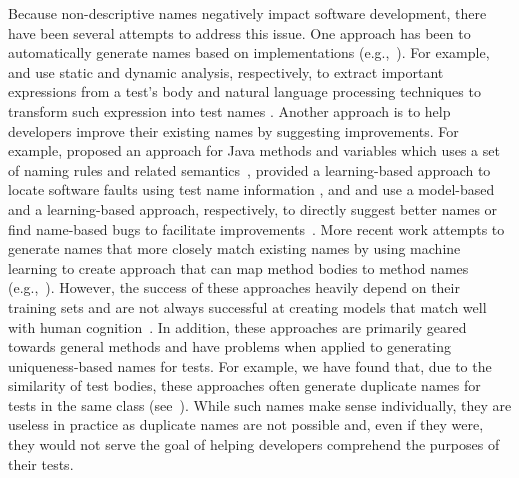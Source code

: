 Because non-descriptive names negatively impact software development, there have been several attempts to address this issue.
%
One approach has been to automatically generate names based on implementations (e.g.,~\cite{arcuri2014automated, zhang2015automatically, daka2017generating}).
%
For example, \citeauthor{zhang2015automatically} and \citeauthor{daka2017generating} use static and dynamic analysis, respectively, to extract important expressions from a test's body and natural language processing techniques to transform such expression into test names \cite{zhang2015automatically, daka2017generating}. 
%
Another approach is to help developers improve their existing names by suggesting improvements.
%
For example, \citeauthor{host2009debugging} proposed an approach for Java methods and variables which uses a set of naming rules and related semantics~\cite{host2009debugging}, \citeauthor{li2019deepfl} provided a learning-based approach to locate software faults using test name information \cite{li2019deepfl}, and \citeauthor{allamanis2015suggesting} and \citeauthor{pradel2018deepbugs} use a model-based and a learning-based approach, respectively, to directly suggest better names or find name-based bugs to facilitate improvements~\cite{allamanis2015suggesting, pradel2018deepbugs}.
%
More recent work attempts to generate names that more closely match existing names by using machine learning to create approach that can map method bodies to method names (e.g.,~\cite{alon2018code2seq, alon2019code2vec}).
%
However, the success of these approaches heavily depend on their training sets and are not always successful at creating models that match well with human cognition~\cite{lison2015introduction}.
%
In addition, these approaches are primarily geared towards general methods and have problems when applied to generating uniqueness-based names for tests.
%
For example, we have found that, due to the similarity of test bodies, these approaches often generate duplicate names for tests in the same class (see~\cite{CodeResult}).
%
While such names make sense individually, they are useless in practice as duplicate names are not possible and, even if they were, they would not serve the goal of helping developers comprehend the purposes of their tests.



